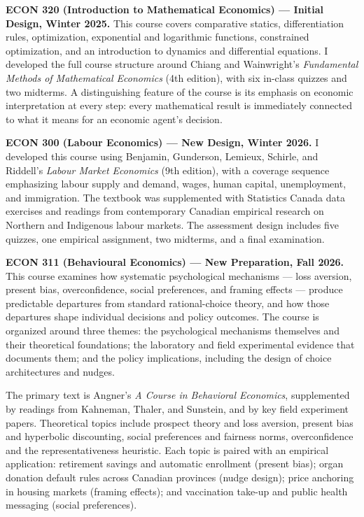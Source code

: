 \documentclass[11pt,letterpaper]{article}
\begin{document}
\textbf{ECON 320 (Introduction to Mathematical Economics) --- Initial Design, Winter 2025.} This course covers comparative statics, differentiation rules, optimization, exponential and logarithmic functions, constrained optimization, and an introduction to dynamics and differential equations. I developed the full course structure around Chiang and Wainwright's \textit{Fundamental Methods of Mathematical Economics} (4th edition), with six in-class quizzes and two midterms. A distinguishing feature of the course is its emphasis on economic interpretation at every step: every mathematical result is immediately connected to what it means for an economic agent's decision.

\textbf{ECON 300 (Labour Economics) --- New Design, Winter 2026.} I developed this course using Benjamin, Gunderson, Lemieux, Schirle, and Riddell's \textit{Labour Market Economics} (9th edition), with a coverage sequence emphasizing labour supply and demand, wages, human capital, unemployment, and immigration. The textbook was supplemented with Statistics Canada data exercises and readings from contemporary Canadian empirical research on Northern and Indigenous labour markets. The assessment design includes five quizzes, one empirical assignment, two midterms, and a final examination.

\textbf{ECON 311 (Behavioural Economics) --- New Preparation, Fall 2026.} This course examines how systematic psychological mechanisms --- loss aversion, present bias, overconfidence, social preferences, and framing effects --- produce predictable departures from standard rational-choice theory, and how those departures shape individual decisions and policy outcomes. The course is organized around three themes: the psychological mechanisms themselves and their theoretical foundations; the laboratory and field experimental evidence that documents them; and the policy implications, including the design of choice architectures and nudges.

The primary text is Angner's \textit{A Course in Behavioral Economics}, supplemented by readings from Kahneman, Thaler, and Sunstein, and by key field experiment papers. Theoretical topics include prospect theory and loss aversion, present bias and hyperbolic discounting, social preferences and fairness norms, overconfidence and the representativeness heuristic. Each topic is paired with an empirical application: retirement savings and automatic enrollment (present bias); organ donation default rules across Canadian provinces (nudge design); price anchoring in housing markets (framing effects); and vaccination take-up and public health messaging (social preferences).
\end{document}
